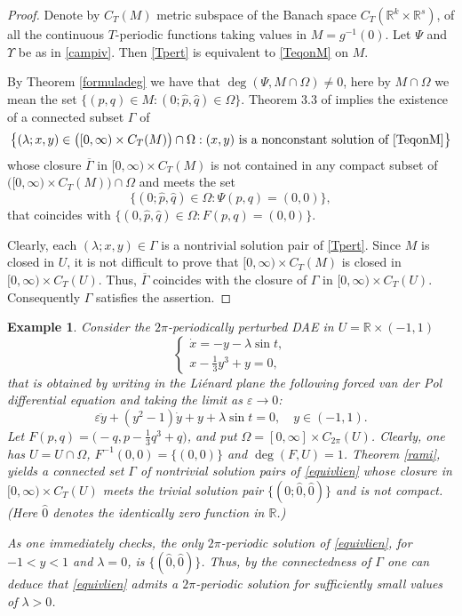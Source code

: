 \documentclass[a4paper]{amsart}
\numberwithin{equation}{section}
\newtheorem{example}[theorem]{Example}
\newcommand{\cl}[1]{\overline{#1}}
\newcommand{\R}{\mathbb{R}}
\newcommand{\e}{\varepsilon}
\begin{document}
\begin{proof}
Denote by $C_T(M)$  metric subspace of the Banach space $C_T(\R^k\times\R^s)$, of all 
the continuous $T$-periodic functions taking values in $M=g^{-1}(0)$. Let $\Psi$ and 
$\Upsilon$ be as in \eqref{campiv}. Then \eqref{Tpert} is equivalent to \eqref{TeqonM} 
on $M$.

By Theorem \ref{formuladeg} we have that $\deg(\Psi,M\cap\Omega)\neq 0$, here by
$M\cap\Omega$ we mean the set $\{ (p,q)\in M:(0;\hat p,\hat q)\in\Omega\}$. Theorem 3.3 
of \cite{FS98} implies the existence of a connected subset $\Gamma$ of
\[
\big\{ (\lambda;x,y)\in\big([0,\infty)\times C_T(M)\big)\cap\Omega:\text{$(x,y)$ is a 
nonconstant solution of \eqref{TeqonM}}\big\}
\]
whose closure $\cl{\Gamma}$ in $[0,\infty)\times C_T(M)$ is not contained in any compact 
subset of $\big([0,\infty)\times C_T(M)\big)\cap\Omega$ and meets the set 
\[
\big\{(0;\hat p,\hat q)\in\Omega:\Psi(p,q)=(0,0)\big\},
\]
that coincides with $\big\{(0,\hat p,\hat q)\in\Omega:F(p,q)=(0,0)\big\}$.

Clearly, each $(\lambda;x,y)\in\Gamma$ is a nontrivial solution pair of \eqref{Tpert}.
Since $M$ is closed in $U$, it is not difficult to prove that 
$[0,\infty)\times C_T(M)$ is closed in $[0,\infty)\times C_T(U)$. Thus, $\cl\Gamma$ 
coincides with the closure of $\Gamma$ in $[0,\infty)\times C_T(U)$. Consequently 
$\Gamma$ satisfies the assertion.
\end{proof}


\begin{example}
Consider the $2\pi$-periodically perturbed DAE in $U=\R\times (-1,1)$
\begin{equation}\label{equivlien}
 \left\{
\begin{array}{l}
 \dot x = -y- \lambda\sin t,\\
 x-\frac{1}{3}y^3 +y =0,
\end{array}\right.
\end{equation}
that is obtained by writing in the Li\'enard plane the following forced van der Pol 
differential equation and taking the limit as $\e\to 0$:
\[
\e\ddot y+ (y^2-1)\dot y+y+\lambda\sin t=0, \quad y\in (-1,1).
\]
Let $F(p,q)=\big(-q,p-\frac{1}{3}q^3 +q\big)$, and put $\Omega=[0,\infty]\times C_{2\pi}(U)$. 
Clearly, one has $U=U\cap\Omega$, $F^{-1}(0,0)=\{(0,0)\}$ and $\deg(F,U)=1$. Theorem 
\ref{rami}, yields a connected set $\Gamma$ of nontrivial solution pairs of \eqref{equivlien} 
whose closure in $[0,\infty)\times C_T(U)$ meets the trivial solution pair 
$\{(0;\hat 0,\hat 0)\}$ and is not compact. (Here $\hat 0$ denotes the identically zero 
function in $\R$.) 

As one immediately checks, the only $2\pi$-periodic solution of \eqref{equivlien}, for
$-1<y<1$ and $\lambda=0$, is $\{(\hat 0,\hat 0)\}$. Thus, by the connectedness of $\Gamma$ 
one can deduce that \eqref{equivlien} admits a $2\pi$-periodic solution for sufficiently 
small values of $\lambda>0$.
\end{example}
\end{document}
